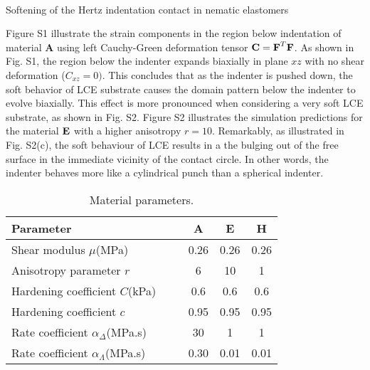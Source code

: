\documentclass[12pt]{article}
\begin{document}
\newpage
\renewcommand\thefigure{S\arabic{figure} \Alph{section}}
\setcounter{figure}{0}
\renewcommand\thepage{S\arabic{page}}
\setcounter{page}{1}


\begin{center}
 \\
{ Softening of the Hertz indentation contact in nematic elastomers }\\
\end{center}



\vspace{0.8cm}
Figure S1 illustrate the strain components in the region below indentation of material {\textbf A} using left Cauchy-Green deformation tensor $\textbf C=\textbf F^T \textbf F$. As shown in Fig. S1, the region below the indenter expands biaxially in plane $xz$ with no shear deformation ($C_{xz}=0)$. This concludes that as the indenter is pushed down, the soft behavior of LCE substrate causes the domain pattern below the indenter to evolve biaxially. This effect is more pronounced when considering a very soft LCE substrate, as shown in Fig. S2. Figure S2 illustrates the simulation predictions for the material $\textbf E$ with a higher anisotropy $r=10$. Remarkably, as illustrated in Fig. S2(c), the soft behaviour of LCE results in a the bulging out of the free surface in the immediate vicinity of the contact circle. In other words, the indenter behaves more like a cylindrical punch than a spherical indenter. 

\begin{table} [h]
\caption{Material parameters. \label{tab:param}}
\centering
\begin{tabular}{l ccc} 
\hline %
Parameter & \textbf{A}  & \textbf{E} & \textbf{H} \\
\hline %
Shear modulus $\mu$(MPa) & 0.26 & 0.26 & 0.26 \\
Anisotropy parameter $r$  & 6 & 10 & 1\\
Hardening coefficient $C$(kPa) \ \ \ & 0.6 & 0.6 & 0.6 \\
Hardening coefficient $c$ & 0.95 & 0.95 & 0.95   \\
Rate coefficient $\alpha_\Delta$(MPa.s) & 30 & 1 & 1 \\
Rate coefficient $\alpha_\Lambda$(MPa.s) & 0.30 & 0.01 & 0.01\\ 
\hline %
\end{tabular}
\end{table}
\end{document}

